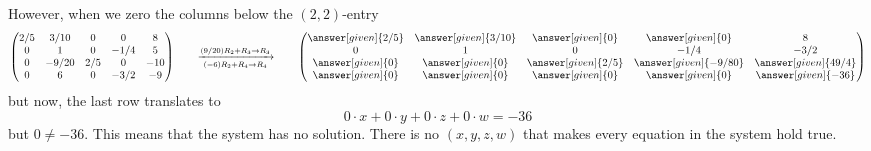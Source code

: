 \documentclass{ximera}
\begin{document}
\begin{example}[No solutions]
\begin{explanation}
\[\]
However, when we zero the columns below the $(2,2)$-entry
\[
  \begin{pmatrix}
    {2/5}&  {3/10} & {0} &{0} &8 \\
    {0}&  {1} & {0} &{-1/4} & 5\\
    {0}&  {-9/20} & {2/5} &{0} &-10\\
    {0}&  {6} & {0} &{-3/2} &-9
  \end{pmatrix}
  \qquad\xrightarrow[(-6) R_2+R_4\to R_4]{(9/20) R_2 + R_3\to R_3}\qquad
  \begin{pmatrix}
    \answer[given]{2/5}&  \answer[given]{3/10} & \answer[given]{0} &\answer[given]{0} &8 \\
    {0}&  {1} & {0} &{-1/4} & -3/2\\
    \answer[given]{0}&  \answer[given]{0} & \answer[given]{2/5} &\answer[given]{-9/80} &\answer[given]{49/4}\\
    \answer[given]{0}&  \answer[given]{0} & \answer[given]{0} &\answer[given]{0} &\answer[given]{-36}
  \end{pmatrix}
\]
but now, the last row translates to
\[
0\cdot x+0\cdot y+0\cdot z+0\cdot w=-36
\]
but $0\ne -36$. This means that the system has no solution. There is
no $(x,y,z,w)$ that makes every equation in the system hold true.
\end{explanation}
\end{example}
\end{document}
